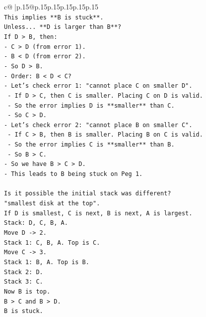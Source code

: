 \documentclass{article}
\begin{document}
{\begin{supertabular}{c@{$\;$}|p{.15\linewidth}@{}p{.15\linewidth}p{.15\linewidth}p{.15\linewidth}p{.15\linewidth}p{.15\linewidth}}
{{{\\ 
\texttt{This implies **B is stuck**.} \\
\texttt{Unless... **D is larger than B**?} \\
\texttt{If D > B, then:} \\
\texttt{{-} C > D (from error 1).} \\
\texttt{{-} B < D (from error 2).} \\
\texttt{{-} So D > B.} \\
\texttt{{-} Order: B < D < C?} \\
\texttt{{-} Let's check error 1: "cannot place C on smaller D".} \\
\texttt{    {-} If D > C, then C is smaller. Placing C on D is valid.} \\
\texttt{    {-} So the error implies D is **smaller** than C.} \\
\texttt{    {-} So C > D.} \\
\texttt{{-} Let's check error 2: "cannot place B on smaller C".} \\
\texttt{    {-} If C > B, then B is smaller. Placing B on C is valid.} \\
\texttt{    {-} So the error implies C is **smaller** than B.} \\
\texttt{    {-} So B > C.} \\
\texttt{{-} So we have B > C > D.} \\
\texttt{{-} This leads to B being stuck on Peg 1.} \\
\\ 
\texttt{Is it possible the initial stack was different?} \\
\texttt{"smallest disk at the top".} \\
\texttt{If D is smallest, C is next, B is next, A is largest.} \\
\texttt{Stack: D, C, B, A.} \\
\texttt{Move D {-}> 2.} \\
\texttt{Stack 1: C, B, A. Top is C.} \\
\texttt{Move C {-}> 3.} \\
\texttt{Stack 1: B, A. Top is B.} \\
\texttt{Stack 2: D.} \\
\texttt{Stack 3: C.} \\
\texttt{Now B is top.} \\
\texttt{B > C and B > D.} \\
\texttt{B is stuck.} \\
\\ 
}}}
\end{supertabular}}
\end{document}
